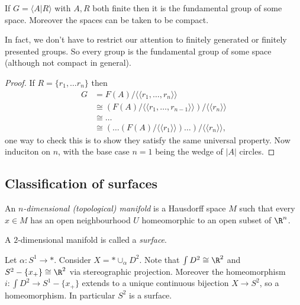 \documentclass[a4paper]{article}
\begin{document}
\begin{theorem}
  If \(G = \langle A | R \rangle\) with \(A, R\) both finite then it is the fundamental group of some space. Moreover the spaces can be taken to be compact.
\end{theorem}

In fact, we don't have to restrict our attention to finitely generated or finitely presented groups. So every group is the fundamental group of some space (although not compact in general).

\begin{proof}
  If \(R = \{r_1, \dots r_n\}\) then
  \begin{align*}
    G &= F(A) / \langle\langle r_1, \dots, r_n \rangle\rangle \\
      &\cong (F(A) / \langle\langle r_1, \dots, r_{n - 1} \rangle\rangle) / \langle\langle r_n \rangle\rangle \\
      &\cong \dots \\
      &\cong (\dots (F(A)/ \langle \langle r_1 \rangle\rangle) \dots ) / \langle\langle r_n \rangle\rangle,
  \end{align*}
  one way to check this is to show they satisfy the same universal property. Now induciton on \(n\), with the base case \(n = 1\) being the wedge of \(|A|\) circles.
\end{proof}

\subsection{Classification of surfaces}

\begin{definition}
  An \emph{\(n\)-dimensional (topological) manifold} is a Hausdorff space \(M\) such that every \(x \in M\) has an open neighbourhood \(U\) homeomorphic to an open subset of \(\R^n\).
\end{definition}

\begin{definition}[surface]
  A \(2\)-dimensional manifold is called a \emph{surface}.
\end{definition}

\begin{eg}
  Let \(\alpha: S^1 \to *\). Consider \(X = * \cup_\alpha D^2\). Note that \(\int D^2 \cong \R^2\) and \(S^2 - \{x_+\} \cong \R^2\) via stereographic projection. Moreover the homeomorphism \(i: \int D^2 \to S^1 - \{x_+\}\) extends to a unique continuous bijection \(X \to S^2\), so a homeomorphism. In particular \(S^2\) is a surface.
\end{eg}
\end{document}
